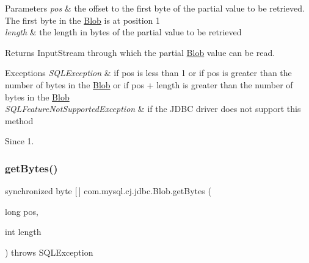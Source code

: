 \begin{DoxyParams}{Parameters}
{\em pos} & the offset to the first byte of the partial value to be retrieved. The first byte in the {\ttfamily \mbox{\hyperlink{classcom_1_1mysql_1_1cj_1_1jdbc_1_1_blob}{Blob}}} is at position 1 \\
\hline
{\em length} & the length in bytes of the partial value to be retrieved \\
\hline
\end{DoxyParams}
\begin{DoxyReturn}{Returns}
{\ttfamily Input\+Stream} through which the partial {\ttfamily \mbox{\hyperlink{classcom_1_1mysql_1_1cj_1_1jdbc_1_1_blob}{Blob}}} value can be read. 
\end{DoxyReturn}

\begin{DoxyExceptions}{Exceptions}
{\em S\+Q\+L\+Exception} & if pos is less than 1 or if pos is greater than the number of bytes in the {\ttfamily \mbox{\hyperlink{classcom_1_1mysql_1_1cj_1_1jdbc_1_1_blob}{Blob}}} or if pos + length is greater than the number of bytes in the {\ttfamily \mbox{\hyperlink{classcom_1_1mysql_1_1cj_1_1jdbc_1_1_blob}{Blob}}}\\
\hline
{\em S\+Q\+L\+Feature\+Not\+Supported\+Exception} & if the J\+D\+BC driver does not support this method \\
\hline
\end{DoxyExceptions}
\begin{DoxySince}{Since}
1. 
\end{DoxySince}
\mbox{\label{classcom_1_1mysql_1_1cj_1_1jdbc_1_1_blob_a44a60687141a091417374ef214a24000}} 
\subsubsection{\texorpdfstring{get\+Bytes()}{getBytes()}}
{\footnotesize\ttfamily synchronized byte \mbox{[}$\,$\mbox{]} com.\+mysql.\+cj.\+jdbc.\+Blob.\+get\+Bytes (\begin{DoxyParamCaption}\item[{long}]{pos,  }\item[{int}]{length }\end{DoxyParamCaption}) throws S\+Q\+L\+Exception}

